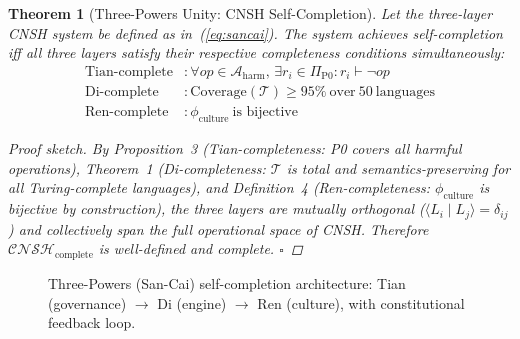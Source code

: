 \documentclass[conference]{IEEEtran}
\newtheorem{theorem}{Theorem}
\begin{document}
\begin{theorem}[Three-Powers Unity: CNSH Self-Completion]
Let the three-layer CNSH system be defined as in~(\ref{eq:sancai}).
The system achieves self-completion iff all three layers satisfy
their respective completeness conditions simultaneously:
\begin{align}
  \text{Tian-complete} &: \forall op \in \mathcal{A}_{\text{harm}},\,
    \exists r_i \in \Pi_{\text{P0}}: r_i \vdash \neg op \\
  \text{Di-complete} &: \text{Coverage}(\mathcal{T}) \geq 95\%\ \text{over}\ 50\ \text{languages} \\
  \text{Ren-complete} &: \phi_{\text{culture}}\ \text{is bijective}
\end{align}

\begin{proof}[Proof sketch]
By Proposition~3 (Tian-completeness: P0 covers all harmful operations),
Theorem~1 (Di-completeness: $\mathcal{T}$ is total and semantics-preserving
for all Turing-complete languages), and Definition~4 (Ren-completeness:
$\phi_{\text{culture}}$ is bijective by construction),
the three layers are mutually orthogonal
($\langle L_i \mid L_j \rangle = \delta_{ij}$)
and collectively span the full operational space of CNSH.
Therefore $\mathcal{CNSH}_{\text{complete}}$ is well-defined
and complete. $\square$
\end{proof}
\end{theorem}

\begin{figure}[t]
\centering
{}
\caption{Three-Powers (San-Cai) self-completion architecture:
  Tian (governance) $\to$ Di (engine) $\to$ Ren (culture),
  with constitutional feedback loop.}
\label{fig:sancai}
\end{figure}
\end{document}
